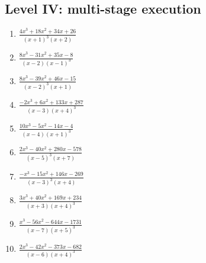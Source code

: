 \documentclass[11pt,oneside]{book}
\begin{document}
\subsection*{Level IV: multi-stage execution}
\begin{enumerate}[leftmargin=*,label=\textbf{\arabic*.},itemsep=0.65\baselineskip]
\item $\displaystyle \frac{4 x^{3} + 18 x^{2} + 34 x + 26}{\left(x + 1\right)^{3} \left(x + 2\right)}$
\item $\displaystyle \frac{8 x^{3} - 31 x^{2} + 35 x - 8}{\left(x - 2\right) \left(x - 1\right)^{3}}$
\item $\displaystyle \frac{8 x^{3} - 39 x^{2} + 46 x - 15}{\left(x - 2\right)^{3} \left(x + 1\right)}$
\item $\displaystyle \frac{- 2 x^{3} + 6 x^{2} + 133 x + 287}{\left(x - 3\right) \left(x + 4\right)^{3}}$
\item $\displaystyle \frac{10 x^{3} - 5 x^{2} - 14 x - 4}{\left(x - 4\right) \left(x + 1\right)^{3}}$
\item $\displaystyle \frac{2 x^{3} - 40 x^{2} + 280 x - 578}{\left(x - 5\right)^{3} \left(x + 7\right)}$
\item $\displaystyle \frac{- x^{3} - 15 x^{2} + 146 x - 269}{\left(x - 3\right)^{3} \left(x + 4\right)}$
\item $\displaystyle \frac{3 x^{3} + 40 x^{2} + 169 x + 234}{\left(x + 3\right) \left(x + 4\right)^{3}}$
\item $\displaystyle \frac{x^{3} - 56 x^{2} - 644 x - 1731}{\left(x - 7\right) \left(x + 5\right)^{3}}$
\item $\displaystyle \frac{2 x^{3} - 42 x^{2} - 373 x - 682}{\left(x - 6\right) \left(x + 4\right)^{3}}$
\end{enumerate}
\end{document}

